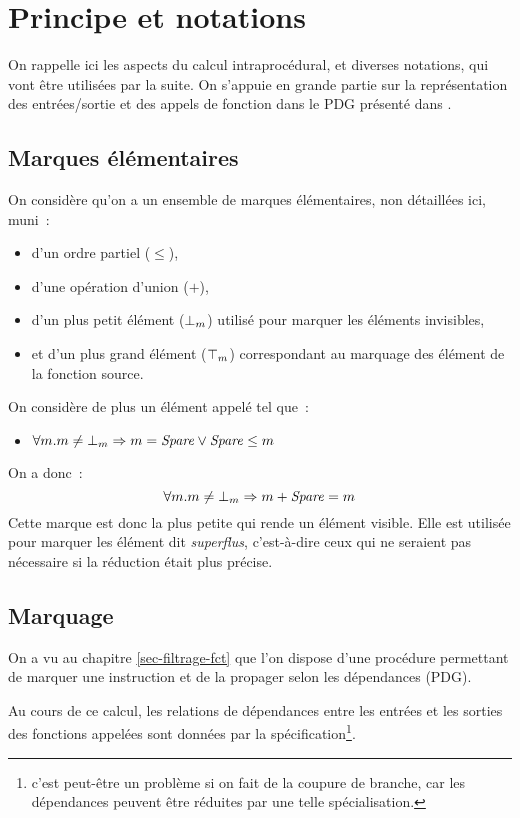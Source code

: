 \section{Principe et notations}

On rappelle ici les aspects du calcul intraprocédural, et diverses notations,
qui vont être utilisées par la suite.
On s'appuie en grande partie sur la représentation des entrées/sortie
et des appels de fonction dans le PDG présenté dans \cite{ppcPdg}.

\subsection{Marques élémentaires}

On considère qu'on a un ensemble de marques élémentaires,
non détaillées ici, muni~:
\begin{itemize}
  \item d'un ordre partiel ($\leq$),
  \item d'une opération d'union ($+$),
  \item d'un plus petit élément (${\bot}_m$) utilisé pour marquer les éléments
    invisibles,
  \item et d'un plus grand élément (${\top}_m$) correspondant au marquage des
    élément de la fonction source.
\end{itemize}

On considère de plus un élément appelé \spare{} tel que~:
\begin{itemize}
  \item $\forall m. m \neq {\bot}_m \Rightarrow m = \mathit{Spare} \lor \mathit{Spare} \leq m$
\end{itemize}
On a donc~:
\begin{equation*}
\forall m. m \neq {\bot}_m \Rightarrow m + \mathit{Spare} = m  
\end{equation*}
Cette marque est donc la plus petite qui rende un élément visible.
Elle est utilisée pour marquer les élément dit {\it superflus}, c'est-à-dire
ceux qui ne seraient pas nécessaire si la réduction était plus précise.

\subsection{Marquage}

On a vu au chapitre \ref{sec-filtrage-fct} que l'on dispose d'une procédure
permettant de marquer une instruction et de la propager
selon les dépendances (PDG). 

Au cours de ce calcul,
les relations de dépendances entre les entrées et les sorties des fonctions
appelées sont données par la spécification\footnote{c'est peut-être un problème
si on fait de la coupure de branche, car les dépendances peuvent être réduites
par une telle spécialisation.}.\bb

